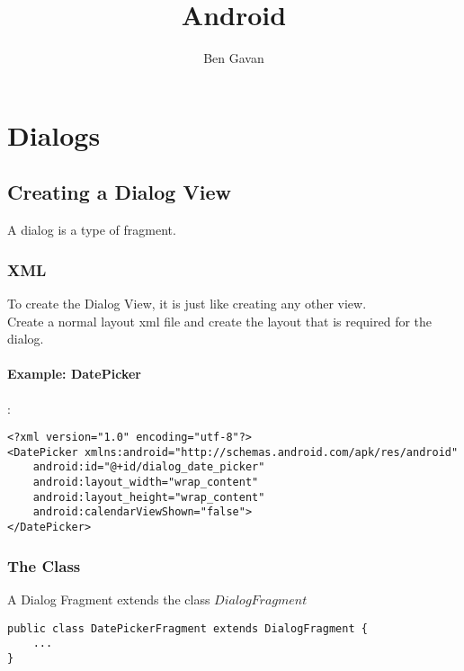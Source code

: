 \documentclass[]{article}
\title{Android}
\author{Ben Gavan}
\begin{document}
\maketitle
\tableofcontents

\section{Dialogs}
\subsection{Creating a Dialog View}
A dialog is a type of fragment.
\subsubsection{XML}
To create the Dialog View, it is just like creating any other view.
\\
Create a normal layout xml file and create the layout that is required for the dialog.
\paragraph{Example: DatePicker}:
\begin{lstlisting}
<?xml version="1.0" encoding="utf-8"?>
<DatePicker xmlns:android="http://schemas.android.com/apk/res/android"
	android:id="@+id/dialog_date_picker"
	android:layout_width="wrap_content"
	android:layout_height="wrap_content"
	android:calendarViewShown="false">
</DatePicker>
\end{lstlisting}

\subsubsection{The Class}
A Dialog Fragment extends the class $DialogFragment$
\begin{lstlisting}
public class DatePickerFragment extends DialogFragment {
	...
}
\end{lstlisting}
\end{document}
